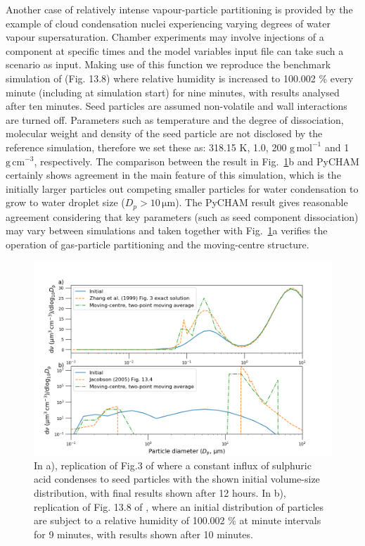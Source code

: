 \documentclass[gmd, manuscript]{copernicus}
\begin{document}
Another case of relatively intense vapour-particle partitioning is provided by the example of cloud condensation nuclei experiencing varying degrees of water vapour supersaturation.  Chamber experiments may involve injections of a component at specific times and the model variables input file can take such a scenario as input.  Making use of this function we reproduce the benchmark simulation of \citet{Jacobson2005} (Fig. 13.8) where relative humidity is increased to 100.002 \% every minute (including at simulation start) for nine minutes, with results analysed after ten minutes.  Seed particles are assumed non-volatile and wall interactions are turned off.  Parameters such as temperature and the degree of dissociation, molecular weight and density of the seed particle are not disclosed by the reference simulation, therefore we set these as: 318.15 K, 1.0, 200 $\mathrm{g\,mol^{-1}}$ and 1 $\mathrm{g\,cm^{-3}}$, respectively.  The comparison between the \citet{Jacobson2005} result in Fig.~\ref{fig:mov_cen_test}b and PyCHAM certainly shows agreement in the main feature of this simulation, which is the initially larger particles out competing smaller particles for water condensation to grow to water droplet size ($D_{p}>10\, \mathrm{\mu m}$).  The PyCHAM result gives reasonable agreement considering that key parameters (such as seed component dissociation) may vary between simulations and taken together with Fig.~\ref{fig:mov_cen_test}a verifies the operation of gas-particle partitioning and the moving-centre structure.

\begin{figure}[t]
\includegraphics[width=12.0cm]{Results/mov_cen_test.png}
\caption{In a), replication of Fig.3 of \citet{Zhang1999} where a constant influx of sulphuric acid condenses to seed particles with the shown initial volume-size distribution, with final results shown after 12 hours.  In b), replication of Fig. 13.8 of \citet{Jacobson2005}, where an initial distribution of particles are subject to a relative humidity of 100.002 \% at minute intervals for 9 minutes, with results shown after 10 minutes.}
\label{fig:mov_cen_test}
\end{figure}
\end{document}
